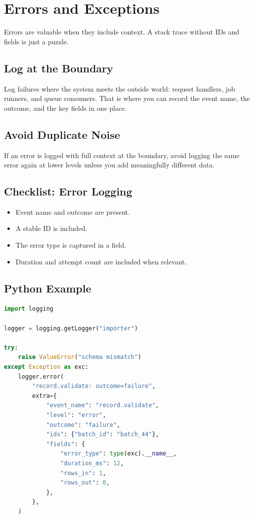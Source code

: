 \chapter{Errors and Exceptions}
Errors are valuable when they include context. A stack trace without IDs and fields is just a puzzle.

\section{Log at the Boundary}
Log failures where the system meets the outside world: request handlers, job runners, and queue consumers. That is where you can record the event name, the outcome, and the key fields in one place.

\section{Avoid Duplicate Noise}
If an error is logged with full context at the boundary, avoid logging the same error again at lower levels unless you add meaningfully different data.

\section{Checklist: Error Logging}
\begin{itemize}
\item Event name and outcome are present.
\item A stable ID is included.
\item The error type is captured in a field.
\item Duration and attempt count are included when relevant.
\end{itemize}

\section{Python Example}
\begin{lstlisting}[language=Python]
import logging

logger = logging.getLogger("importer")

try:
    raise ValueError("schema mismatch")
except Exception as exc:
    logger.error(
        "record.validate: outcome=failure",
        extra={
            "event_name": "record.validate",
            "level": "error",
            "outcome": "failure",
            "ids": {"batch_id": "batch_44"},
            "fields": {
                "error_type": type(exc).__name__,
                "duration_ms": 12,
                "rows_in": 1,
                "rows_out": 0,
            },
        },
    )
\end{lstlisting}

